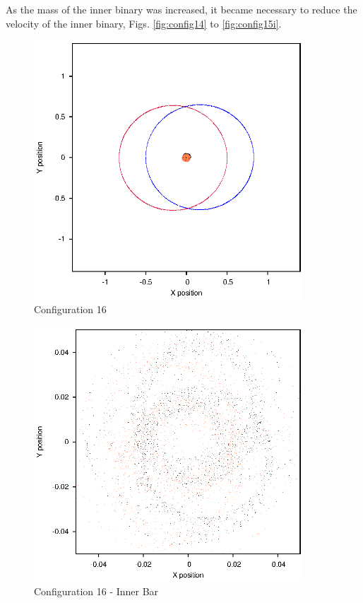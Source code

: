 \documentclass[a4paper,12pt]{article}
\begin{document}
As the mass of the inner binary was increased, it became necessary to reduce the velocity of the inner binary, Figs. \ref{fig:config14} to \ref{fig:config15i}.

\begin{figure}[H]
\centering
\includegraphics[width=0.9\textwidth]{./2017results/05-75-045-4/Orbit.eps}
\caption{Configuration 16}
\label{fig:config16}
\end{figure}
\begin{figure}[H]
\centering
\includegraphics[width=0.9\textwidth]{./2017results/05-75-045-4/Inner.eps}
\caption{Configuration 16 - Inner Bar}
\label{fig:config16i}
\end{figure}
\end{document}
